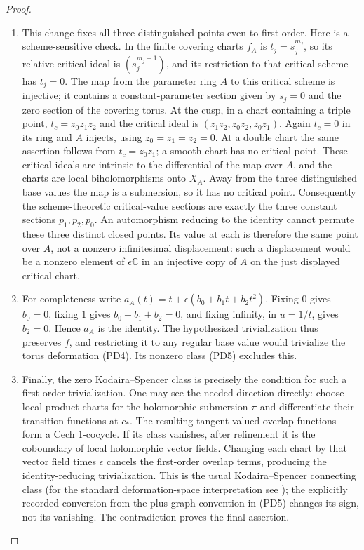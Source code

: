 \begin{proof}
\begin{enumerate}[label=\arabic*.,leftmargin=*]
\item This change fixes all three distinguished points even to first order.
Here is a scheme-sensitive check. In the finite covering charts
$f_A$ is $t_j=s_j^{m_j}$, so its relative critical ideal is
$(s_j^{m_j-1})$, and its restriction to that critical scheme has
$t_j=0$. The map from the parameter ring $A$ to this critical
scheme is injective; it contains a constant-parameter section given
by $s_j=0$ and the zero section of the covering torus.
At the cusp, in a chart containing a triple point,
$t_c=z_0z_1z_2$ and the critical ideal is
$(z_1z_2,z_0z_2,z_0z_1)$. Again $t_c=0$ in its ring and $A$ injects,
using $z_0=z_1=z_2=0$. At a double chart the same assertion follows
from $t_c=z_0z_1$; a smooth chart has no critical point.
These critical ideals are intrinsic to the differential of the map
over $A$, and the charts are local biholomorphisms onto $X_A$.
Away from the three distinguished base values the map is a
submersion, so it has no critical point.
Consequently the scheme-theoretic critical-value sections are exactly
the three constant sections $p_1,p_2,p_0$. An automorphism reducing
to the identity cannot permute these three distinct closed points.
Its value at each is therefore the same point over $A$, not a
nonzero infinitesimal displacement: such a displacement would be a
nonzero element of $\epsilon\mathbb C$ in an injective copy of $A$
on the just displayed critical chart.

\item For completeness write $a_A(t)=t+\epsilon(b_0+b_1t+b_2t^2)$.
Fixing $0$ gives $b_0=0$, fixing $1$ gives $b_0+b_1+b_2=0$,
and fixing infinity, in $u=1/t$, gives $b_2=0$.
Hence $a_A$ is the identity. The hypothesized trivialization thus
preserves $f$, and restricting it to any regular base value would
trivialize the torus deformation (PD4). Its nonzero class (PD5)
excludes this.

\item Finally, the zero Kodaira--Spencer class is precisely the condition for
such a first-order trivialization. One may see the needed direction
directly: choose local product charts for the holomorphic submersion
$\pi$ and differentiate their transition functions at $c_*$. The
resulting tangent-valued overlap functions form a Cech $1$-cocycle.
If its class vanishes, after refinement it is the coboundary of local
holomorphic vector fields. Changing each chart by that vector field
times $\epsilon$ cancels the first-order overlap terms, producing
the identity-reducing trivialization. This is the usual
Kodaira--Spencer connecting class (for the standard deformation-space
interpretation see \cite[Section~67, p.~15]{McMullen1996Complex});
the explicitly recorded conversion
from the plus-graph convention in (PD5) changes its sign, not its
vanishing. The contradiction proves the final assertion.
\end{enumerate}
\end{proof}

